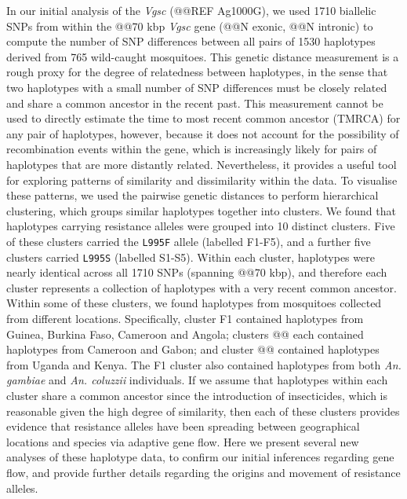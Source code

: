 \documentclass[a4paper,11pt,abstracton]{scrartcl}
\begin{document}
%
In our initial analysis of the \textit{Vgsc} (@@REF Ag1000G), we used 1710 biallelic SNPs from within the @@70 kbp \textit{Vgsc} gene (@@N exonic, @@N intronic) to compute the number of SNP differences between all pairs of 1530 haplotypes derived from 765 wild-caught mosquitoes.
%
This genetic distance measurement is a rough proxy for the degree of relatedness between haplotypes, in the sense that two haplotypes with a small number of SNP differences must be closely related and share a common ancestor in the recent past.
%
This measurement cannot be used to directly estimate the time to most recent common ancestor (TMRCA) for any pair of haplotypes, however, because it does not account for the possibility of recombination events within the gene, which is increasingly likely for pairs of haplotypes that are more distantly related.
%
Nevertheless, it provides a useful tool for exploring patterns of similarity and dissimilarity within the data.
%
To visualise these patterns, we used the pairwise genetic distances to perform hierarchical clustering, which groups similar haplotypes together into clusters.
%
We found that haplotypes carrying resistance alleles were grouped into 10 distinct clusters.
%
Five of these clusters carried the \texttt{L995F} allele (labelled F1-F5), and a further five clusters carried \texttt{L995S} (labelled S1-S5).
%
Within each cluster, haplotypes were nearly identical across all 1710 SNPs (spanning @@70 kbp), and therefore each cluster represents a collection of haplotypes with a very recent common ancestor.
%
Within some of these clusters, we found haplotypes from mosquitoes collected from different locations. 
%
Specifically, cluster F1 contained haplotypes from Guinea, Burkina Faso, Cameroon and Angola; clusters @@ each contained haplotypes from Cameroon and Gabon; and cluster @@ contained haplotypes from Uganda and Kenya.
%
The F1 cluster also contained haplotypes from both \textit{An. gambiae} and \textit{An. coluzzii} individuals.
%
If we assume that haplotypes within each cluster share a common ancestor since the introduction of insecticides, which is reasonable given the high degree of similarity, then each of these clusters provides evidence that resistance alleles have been spreading between geographical locations and species via adaptive gene flow.
%
Here we present several new analyses of these haplotype data, to confirm our initial inferences regarding gene flow, and provide further details regarding the origins and movement of resistance alleles.
%
\end{document}

